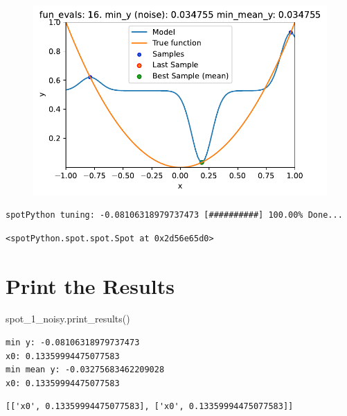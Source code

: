 \documentclass[
  letterpaper,
  DIV=11,
  numbers=noendperiod]{scrreprt}
\newenvironment{Shaded}{\begin{snugshade}}{\end{snugshade}}
\newcommand{\NormalTok}[1]{\textcolor[rgb]{0.00,0.23,0.31}{#1}}
\begin{document}
\begin{figure}[H]

{\centering \includegraphics{014_num_spot_ocba_files/figure-pdf/cell-6-output-10.pdf}

}

\end{figure}

\begin{verbatim}
spotPython tuning: -0.08106318979737473 [##########] 100.00% Done...
\end{verbatim}

\begin{verbatim}
<spotPython.spot.spot.Spot at 0x2d56e65d0>
\end{verbatim}

\hypertarget{print-the-results-4}{%
\section{Print the Results}\label{print-the-results-4}}

\begin{Shaded}
\begin{Highlighting}[]
\NormalTok{spot\_1\_noisy.print\_results()}
\end{Highlighting}
\end{Shaded}

\begin{verbatim}
min y: -0.08106318979737473
x0: 0.13359994475077583
min mean y: -0.03275683462209028
x0: 0.13359994475077583
\end{verbatim}

\begin{verbatim}
[['x0', 0.13359994475077583], ['x0', 0.13359994475077583]]
\end{verbatim}
\end{document}
